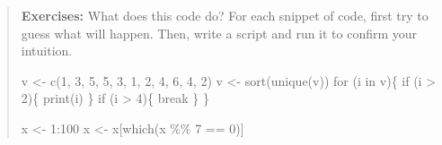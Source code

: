 \documentclass[
  letterpaper,
  DIV=11,
  numbers=noendperiod]{scrreprt}
\newenvironment{Shaded}{\begin{snugshade}}{\end{snugshade}}
\newcommand{\ControlFlowTok}[1]{\textcolor[rgb]{0.00,0.23,0.31}{#1}}
\newcommand{\DecValTok}[1]{\textcolor[rgb]{0.68,0.00,0.00}{#1}}
\newcommand{\FunctionTok}[1]{\textcolor[rgb]{0.28,0.35,0.67}{#1}}
\newcommand{\NormalTok}[1]{\textcolor[rgb]{0.00,0.23,0.31}{#1}}
\newcommand{\OtherTok}[1]{\textcolor[rgb]{0.00,0.23,0.31}{#1}}
\newcommand{\SpecialCharTok}[1]{\textcolor[rgb]{0.37,0.37,0.37}{#1}}
\begin{document}
\begin{quote}
\textbf{Exercises:} What does this code do? For each snippet of code,
first try to guess what will happen. Then, write a script and run it to
confirm your intuition.

\begin{Shaded}
\begin{Highlighting}[]
\NormalTok{v }\OtherTok{\textless{}{-}} \FunctionTok{c}\NormalTok{(}\DecValTok{1}\NormalTok{, }\DecValTok{3}\NormalTok{, }\DecValTok{5}\NormalTok{, }\DecValTok{5}\NormalTok{, }\DecValTok{3}\NormalTok{, }\DecValTok{1}\NormalTok{, }\DecValTok{2}\NormalTok{, }\DecValTok{4}\NormalTok{, }\DecValTok{6}\NormalTok{, }\DecValTok{4}\NormalTok{, }\DecValTok{2}\NormalTok{)}
\NormalTok{v }\OtherTok{\textless{}{-}} \FunctionTok{sort}\NormalTok{(}\FunctionTok{unique}\NormalTok{(v))}
\ControlFlowTok{for}\NormalTok{ (i }\ControlFlowTok{in}\NormalTok{ v)\{}
  \ControlFlowTok{if}\NormalTok{ (i }\SpecialCharTok{\textgreater{}} \DecValTok{2}\NormalTok{)\{}
    \FunctionTok{print}\NormalTok{(i)}
\NormalTok{  \}}
  \ControlFlowTok{if}\NormalTok{ (i }\SpecialCharTok{\textgreater{}} \DecValTok{4}\NormalTok{)\{}
    \ControlFlowTok{break}
\NormalTok{  \}}
\NormalTok{\}}
\end{Highlighting}
\end{Shaded}

\begin{Shaded}
\begin{Highlighting}[]
\NormalTok{x }\OtherTok{\textless{}{-}} \DecValTok{1}\SpecialCharTok{:}\DecValTok{100}
\NormalTok{x }\OtherTok{\textless{}{-}}\NormalTok{ x[}\FunctionTok{which}\NormalTok{(x }\SpecialCharTok{\%\%} \DecValTok{7} \SpecialCharTok{==} \DecValTok{0}\NormalTok{)]}
\end{Highlighting}
\end{Shaded}


\end{quote}
\end{document}
